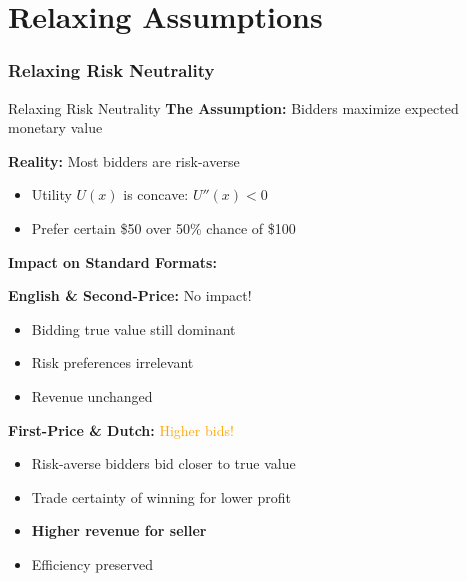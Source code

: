 \documentclass[xcolor={x11names}, aspectratio=169 ]{beamer}
\begin{document}
\part{Relaxing Assumptions}
\section{Relaxing Risk Neutrality}

\begin{frame}{Relaxing Risk Neutrality}
\textbf{The Assumption:} Bidders maximize expected monetary value

\textbf{Reality:} Most bidders are risk-averse
\begin{itemize}
  \item Utility $U(x)$ is concave: $U''(x) < 0$
  \item Prefer certain \$50 over 50\% chance of \$100
\end{itemize}

\textbf{Impact on Standard Formats:}

\textbf{English \& Second-Price:} \textcolor{green!70!black}{No impact!}
\begin{itemize}
  \item Bidding true value still dominant
  \item Risk preferences irrelevant
  \item Revenue unchanged
\end{itemize}

\textbf{First-Price \& Dutch:} \textcolor{orange}{Higher bids!}
\begin{itemize}
  \item Risk-averse bidders bid closer to true value
  \item Trade certainty of winning for lower profit
  \item \textbf{Higher revenue for seller}
  \item Efficiency preserved
\end{itemize}
\end{frame}
\end{document}
